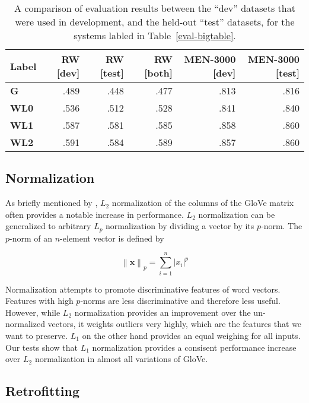\documentclass[letterpaper]{article}
\begin{document}
\begin{table*}[t]
\centering
\begin{tabular}{lrrrrr}
\toprule
Label   & RW [dev] & RW [test] & RW [both] & MEN-3000 [dev] & MEN-3000 [test] \\
\midrule
\bf G   & .489  & .448  & .477  & .813  & .816 \\
\bf WL0 & .536  & .512  & .528  & .841  & .840 \\
\bf WL1 & .587  & .581  & .585  & .858  & .860 \\
\bf WL2 & .591  & .584  & .589  & .857  & .860 \\
\bottomrule
\end{tabular}

\caption{
    A comparison of evaluation results between the ``dev'' datasets that were
    used in development, and the held-out ``test'' datasets, for the systems
    labled in Table~\ref{eval-bigtable}.
}
\label{eval-dev-test}
\end{table*}


\subsection{Normalization}

As briefly mentioned by , $L_2$ normalization of
the columns of the GloVe matrix often provides a notable increase in
performance. $L_2$ normalization can be generalized to arbitrary
$L_p$ normalization by dividing a vector by its $p$-norm. The $p$-norm of an
$n$-element vector is defined by

$$ \left\|\mathbf{x}\right\|_p
  = \sum_{i=1}^n \left|x_i\right|^p$$

Normalization attempts to promote discriminative features of word vectors.
Features with high $p$-norms are less discriminative and therefore less useful.
However, while $L_2$ normalization provides an improvement over the un-normalized
vectors, it weights outliers very highly, which are the features that we want to
preserve. $L_1$ on the other hand provides an equal weighing for all inputs.
Our tests show that $L_1$ normalization provides a consisent performance
increase over $L_2$ normalization in almost all variations of GloVe.

\subsection{Retrofitting}
\end{document}
